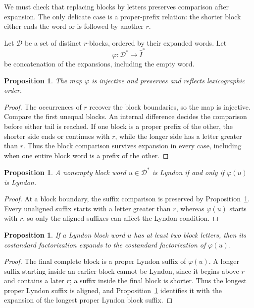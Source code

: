 \documentclass[11pt]{amsart}
\numberwithin{equation}{section}
\newtheorem{proposition}[theorem]{Proposition}
\theoremstyle{definition}
\begin{document}
We must check that replacing blocks by letters preserves comparison after expansion. The only delicate case is a proper-prefix relation: the shorter block either ends the word or is followed by another $r$.

Let $\mathcal D$ be a set of distinct $r$-blocks, ordered by their expanded words. Let
\[
 \varphi:\mathcal D^*\longrightarrow\widehat I^*
\]
be concatenation of the expansions, including the empty word.

\begin{proposition}\label{prop:embedding}
The map $\varphi$ is injective and preserves and reflects lexicographic order.
\end{proposition}
\begin{proof}
The occurrences of $r$ recover the block boundaries, so the map is injective. Compare the first unequal blocks. An internal difference decides the comparison before either tail is reached. If one block is a proper prefix of the other, the shorter side ends or continues with $r$, while the longer side has a letter greater than $r$. Thus the block comparison survives expansion in every case, including when one entire block word is a prefix of the other.
\end{proof}

\begin{proposition}\label{prop:lyndon-substitution}
A nonempty block word $u\in\mathcal D^*$ is Lyndon if and only if $\varphi(u)$ is Lyndon.
\end{proposition}
\begin{proof}
At a block boundary, the suffix comparison is preserved by Proposition~\ref{prop:embedding}. Every unaligned suffix starts with a letter greater than $r$, whereas $\varphi(u)$ starts with $r$, so only the aligned suffixes can affect the Lyndon condition.
\end{proof}

\begin{proposition}\label{prop:costandard-substitution}
If a Lyndon block word $u$ has at least two block letters, then its costandard factorization expands to the costandard factorization of $\varphi(u)$.
\end{proposition}
\begin{proof}
The final complete block is a proper Lyndon suffix of $\varphi(u)$. A longer suffix starting inside an earlier block cannot be Lyndon, since it begins above $r$ and contains a later $r$; a suffix inside the final block is shorter. Thus the longest proper Lyndon suffix is aligned, and Proposition~\ref{prop:lyndon-substitution} identifies it with the expansion of the longest proper Lyndon block suffix.
\end{proof}
\end{document}
